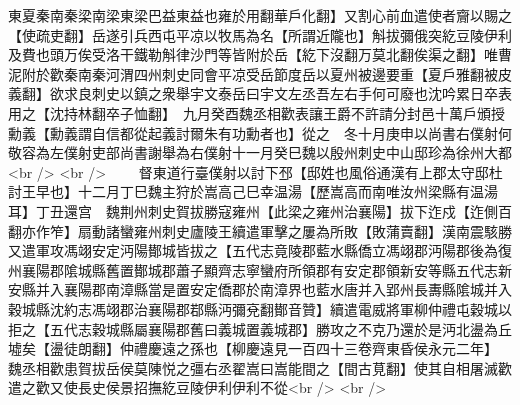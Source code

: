 東夏秦南秦梁南梁東梁巴益東益也雍於用翻華戶化翻】又割心前血遣使者齎以賜之【使疏吏翻】岳遂引兵西屯平凉以牧馬為名【所謂近隴也】斛拔彌俄突紇豆陵伊利及費也頭万俟受洛干鐵勒斛律沙門等皆附於岳【紇下沒翻万莫北翻俟渠之翻】唯曹泥附於歡秦南秦河渭四州刺史同會平凉受岳節度岳以夏州被邊要重【夏戶雅翻被皮義翻】欲求良刺史以鎮之衆舉宇文泰岳曰宇文左丞吾左右手何可廢也沈吟累日卒表用之【沈持林翻卒子恤翻】　九月癸酉魏丞相歡表讓王爵不許請分封邑十萬戶頒授勳義【勳義謂自信都從起義討爾朱有功勳者也】從之　冬十月庚申以尚書右僕射何敬容為左僕射吏部尚書謝舉為右僕射十一月癸巳魏以殷州刺史中山邸珍為徐州大都<br />
<br />
　　督東道行臺僕射以討下邳【邸姓也風俗通漢有上郡太守邸杜討王早也】十二月丁巳魏主狩於嵩高己巳幸温湯【歷嵩高而南唯汝州梁縣有温湯耳】丁丑還宫　魏荆州刺史賀拔勝寇雍州【此梁之雍州治襄陽】拔下迮戍【迮側百翻亦作笮】扇動諸蠻雍州刺史廬陵王續遣軍擊之屢為所敗【敗蒲賣翻】漢南震駭勝又遣軍攻馮翊安定沔陽鄼城皆拔之【五代志竟陵郡藍水縣僑立馮翊郡沔陽郡後為復州襄陽郡隂城縣舊置鄼城郡蕭子顯齊志寧蠻府所領郡有安定郡領新安等縣五代志新安縣并入襄陽郡南漳縣當是置安定僑郡於南漳界也藍水唐并入郢州長夀縣隂城并入穀城縣沈約志馮翊郡治襄陽郡鄀縣沔彌兗翻鄼音贊】續遣電威將軍柳仲禮屯穀城以拒之【五代志穀城縣屬襄陽郡舊曰義城置義城郡】勝攻之不克乃還於是沔北盪為丘墟矣【盪徒朗翻】仲禮慶遠之孫也【柳慶遠見一百四十三卷齊東昏侯永元二年】　魏丞相歡患賀拔岳侯莫陳悦之彊右丞翟嵩曰嵩能間之【間古莧翻】使其自相屠滅歡遣之歡又使長史侯景招撫紇豆陵伊利伊利不從<br />
<br />
